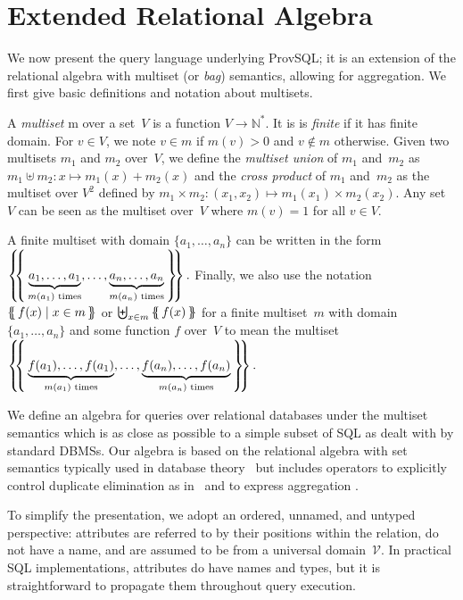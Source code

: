 \section{Extended Relational Algebra}
\label{sec:prelim}

We now present the query language underlying ProvSQL; it is an extension
of the relational algebra with multiset (or \emph{bag}) semantics, allowing for
aggregation. We first give basic definitions and notation about multisets.

\begin{definition}
	A \emph{multiset} m over a set~$V$ is a function $V\to\mathbb{N}^*$. It
	is
	is \emph{finite} if it has finite domain. For $v\in V$, we note $v\in m$ if $m(v)>0$
	and $v\not\in m$ otherwise.
	Given two
	multisets $m_1$ and $m_2$ over~$V$, we define the \emph{multiset union} of
	$m_1$ and~$m_2$ as $m_1\uplus m_2: x\mapsto
		m_1(x)+m_2(x)$ and the \emph{cross product} of $m_1$ and~$m_2$ as the multiset
	over $V^2$ defined by $m_1\times m_2:(x_1,x_2)\mapsto m_1(x_1)\times
		m_2(x_2)$. Any set~$V$ can be seen as the multiset over~$V$ where $m(v)=1$ for
	all $v\in V$.

	A finite multiset with
	domain $\{a_1,\dots,a_n\}$ can be
	written in the form
	\(\left\{\!\!\left\{\,\underbrace{a_1,\dots,a_1}_{\text{$m(a_1)$ times}},\dots,
	\underbrace{a_n,\dots,a_n}_{\text{$m(a_n)$ times}}\,\right\}\!\!\right\}.\)
	Finally, we also use the notation $\left\{\!\!\left\{\,f(x)\mid x\in m\,\right\}\!\!\right\}$ or
	$\biguplus_{x\in m} \left\{\!\!\left\{\,f(x)\,\right\}\!\!\right\}$ for
	a finite multiset~$m$ with domain $\{a_1,\dots,a_n\}$ and some function
	$f$ over~$V$
	to mean the multiset
	\(\left\{\!\!\left\{\,\underbrace{f(a_1),\dots,f(a_1)}_{\text{$m(a_1)$ times}},\dots,
	\underbrace{f(a_n),\dots,f(a_n)}_{\text{$m(a_n)$ times}}\,\right\}\!\!\right\}.\)
\end{definition}

We define an algebra for queries over relational databases under the
multiset semantics
which is as close as possible to a simple subset of SQL as
dealt with by standard DBMSs.
Our algebra is based on the relational algebra with set
semantics typically used in database
theory~\cite{DBLP:books/aw/AbiteboulHV95} but includes
operators to explicitly control
duplicate elimination as
in~\cite{DBLP:conf/pods/DayalGK82,DBLP:journals/iandc/GrumbachM99} and
to express aggregation \cite{DBLP:journals/tcs/Libkin03}.

To simplify the presentation, we adopt an ordered, unnamed, and untyped
perspective: attributes are referred to by their positions within the
relation, do not have a name, and are assumed to be from a universal
domain~$\mathcal{V}$. In practical SQL implementations, attributes do have names and
types, but it is straightforward to propagate them throughout query
execution.

